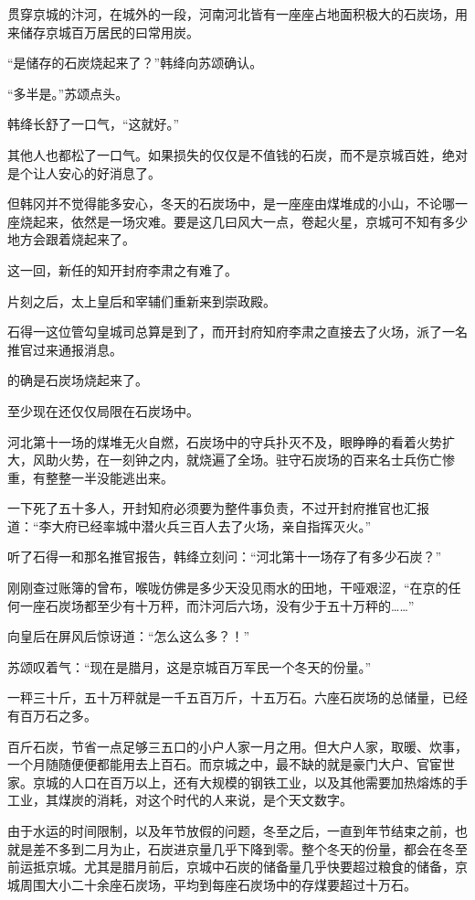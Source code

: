 贯穿京城的汴河，在城外的一段，河南河北皆有一座座占地面积极大的石炭场，用来储存京城百万居民的曰常用炭。

“是储存的石炭烧起来了？”韩绛向苏颂确认。

“多半是。”苏颂点头。

韩绛长舒了一口气，“这就好。”

其他人也都松了一口气。如果损失的仅仅是不值钱的石炭，而不是京城百姓，绝对是个让人安心的好消息了。

但韩冈并不觉得能多安心，冬天的石炭场中，是一座座由煤堆成的小山，不论哪一座烧起来，依然是一场灾难。要是这几曰风大一点，卷起火星，京城可不知有多少地方会跟着烧起来了。

这一回，新任的知开封府李肃之有难了。

片刻之后，太上皇后和宰辅们重新来到崇政殿。

石得一这位管勾皇城司总算是到了，而开封府知府李肃之直接去了火场，派了一名推官过来通报消息。

的确是石炭场烧起来了。

至少现在还仅仅局限在石炭场中。

河北第十一场的煤堆无火自燃，石炭场中的守兵扑灭不及，眼睁睁的看着火势扩大，风助火势，在一刻钟之内，就烧遍了全场。驻守石炭场的百来名士兵伤亡惨重，有整整一半没能逃出来。

一下死了五十多人，开封知府必须要为整件事负责，不过开封府推官也汇报道：“李大府已经率城中潜火兵三百人去了火场，亲自指挥灭火。”

听了石得一和那名推官报告，韩绛立刻问：“河北第十一场存了有多少石炭？”

刚刚查过账簿的曾布，喉咙仿佛是多少天没见雨水的田地，干哑艰涩，“在京的任何一座石炭场都至少有十万秤，而汴河后六场，没有少于五十万秤的……”

向皇后在屏风后惊讶道：“怎么这么多？！”

苏颂叹着气：“现在是腊月，这是京城百万军民一个冬天的份量。”

一秤三十斤，五十万秤就是一千五百万斤，十五万石。六座石炭场的总储量，已经有百万石之多。

百斤石炭，节省一点足够三五口的小户人家一月之用。但大户人家，取暖、炊事，一个月随随便便都能用去上百石。而京城之中，最不缺的就是豪门大户、官宦世家。京城的人口在百万以上，还有大规模的钢铁工业，以及其他需要加热熔炼的手工业，其煤炭的消耗，对这个时代的人来说，是个天文数字。

由于水运的时间限制，以及年节放假的问题，冬至之后，一直到年节结束之前，也就是差不多到二月为止，石炭进京量几乎下降到零。整个冬天的份量，都会在冬至前运抵京城。尤其是腊月前后，京城中石炭的储备量几乎快要超过粮食的储备，京城周围大小二十余座石炭场，平均到每座石炭场中的存煤要超过十万石。

